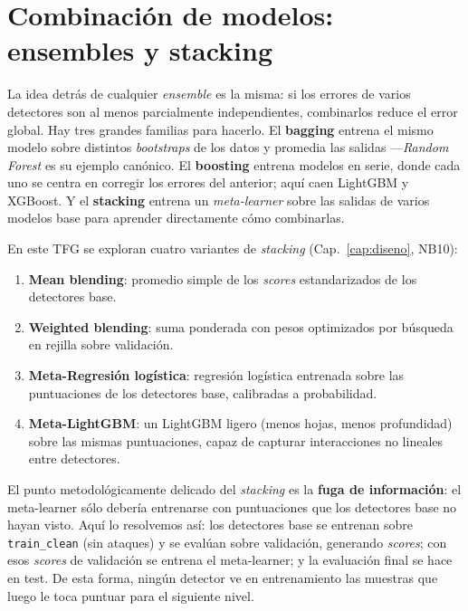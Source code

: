 \section{Combinación de modelos: ensembles y stacking}
\label{sec:teo-stacking}

La idea detrás de cualquier \textit{ensemble} es la misma: si los errores de varios detectores son al menos parcialmente independientes, combinarlos reduce el error global. Hay tres grandes familias para hacerlo. El \textbf{bagging} \cite{breiman1996bagging} entrena el mismo modelo sobre distintos \textit{bootstraps} de los datos y promedia las salidas ---\textit{Random Forest} es su ejemplo canónico. El \textbf{boosting} \cite{freund1996adaboost} entrena modelos en serie, donde cada uno se centra en corregir los errores del anterior; aquí caen LightGBM y XGBoost. Y el \textbf{stacking} \cite{wolpert1992stacked} entrena un \emph{meta-learner} sobre las salidas de varios modelos base para aprender directamente cómo combinarlas.

En este TFG se exploran cuatro variantes de \emph{stacking} (Cap.~\ref{cap:diseno}, NB10):
\begin{enumerate}[leftmargin=*,topsep=0pt]
  \item \textbf{Mean blending}: promedio simple de los \textit{scores} estandarizados de los detectores base.
  \item \textbf{Weighted blending}: suma ponderada con pesos optimizados por búsqueda en rejilla sobre validación.
  \item \textbf{Meta-Regresión logística}: regresión logística entrenada sobre las puntuaciones de los detectores base, calibradas a probabilidad.
  \item \textbf{Meta-LightGBM}: un LightGBM ligero (menos hojas, menos profundidad) sobre las mismas puntuaciones, capaz de capturar interacciones no lineales entre detectores.
\end{enumerate}

El punto metodológicamente delicado del \textit{stacking} es la \textbf{fuga de información}: el meta-learner sólo debería entrenarse con puntuaciones que los detectores base no hayan visto. Aquí lo resolvemos así: los detectores base se entrenan sobre \texttt{train\_clean} (sin ataques) y se evalúan sobre validación, generando \textit{scores}; con esos \textit{scores} de validación se entrena el meta-learner; y la evaluación final se hace en test. De esta forma, ningún detector ve en entrenamiento las muestras que luego le toca puntuar para el siguiente nivel.

